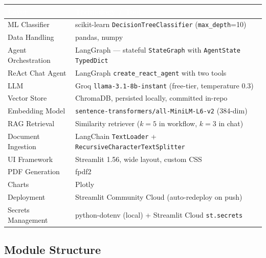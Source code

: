 \documentclass[11pt,a4paper]{article}
\newcommand{\hdrrow}[1]{\textcolor{white}{\textbf{#1}}}
\newcommand{\hdrline}{\rowcolor{navy}}
\begin{document}
\begin{tabularx}{\textwidth}{|>{\hsize=0.35\hsize}X|X|}
\hline
\hdrline \hdrrow{Layer} & \hdrrow{Technology / Tool} \\ \hline
ML Classifier         & scikit-learn \texttt{DecisionTreeClassifier} (\texttt{max\_depth}=10) \\ \hline
Data Handling         & pandas, numpy \\ \hline
Agent Orchestration   & LangGraph --- stateful \texttt{StateGraph} with \texttt{AgentState} \texttt{TypedDict} \\ \hline
ReAct Chat Agent      & LangGraph \texttt{create\_react\_agent} with two tools \\ \hline
LLM                   & Groq \texttt{llama-3.1-8b-instant} (free-tier, temperature 0.3) \\ \hline
Vector Store          & ChromaDB, persisted locally, committed in-repo \\ \hline
Embedding Model       & \texttt{sentence-transformers/all-MiniLM-L6-v2} (384-dim) \\ \hline
RAG Retrieval         & Similarity retriever ($k{=}5$ in workflow, $k{=}3$ in chat) \\ \hline
Document Ingestion    & LangChain \texttt{TextLoader} + \texttt{RecursiveCharacterTextSplitter} \\ \hline
UI Framework          & Streamlit 1.56, wide layout, custom CSS \\ \hline
PDF Generation        & fpdf2 \\ \hline
Charts                & Plotly \\ \hline
Deployment            & Streamlit Community Cloud (auto-redeploy on push) \\ \hline
Secrets Management    & python-dotenv (local) + Streamlit Cloud \texttt{st.secrets} \\ \hline
\end{tabularx}

\subsection{Module Structure}
\end{document}
